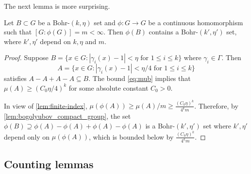 


The next lemma is more surprising.

\begin{lemma} \label{lem:bohr-homo2}
Let $B \subset G$ be a Bohr-$(k, \eta)$ set and $\phi: G \rightarrow G$ be a continuous homomorphism such that $[G:\phi(G)] = m < \infty$. Then $\phi(B)$ contains a Bohr-$(k', \eta')$ set, where $k', \eta'$ depend on $k, \eta$ and $m$.
\end{lemma}

\begin{proof}
Suppose $B = \{x \in G: |\gamma_i(x) - 1| < \eta \text{ for } 1 \leq i \leq k\}$ where $\gamma_i \in \Gamma$. Then 
\[
    A = \{x \in G: |\gamma_i(x) - 1| < \eta/4 \text{ for } 1 \leq i \leq k\}
\]
satisfies $A - A + A - A \subseteq B$. The bound \eqref{eq:mub} implies that $\mu(A) \geq (C_0\eta/4)^k$ for some absolute constant $C_0>0$. 

In view of \cref{lem:finite-index}, $\mu(\phi(A)) \geq \mu(A)/m \geq \frac{(C_0 \eta)^k}{4^k m}$. Therefore, by \cref{lem:bogolyubov_compact_group}, the set $\phi(B) \supseteq \phi(A) - \phi(A) + \phi(A) - \phi(A)$ is a Bohr-$(k', \eta')$ set where $k', \eta'$ depend only on $\mu(\phi(A))$, which is bounded below by $\frac{(C_0 \eta)^k}{4^k m}$.
\end{proof}

\subsection{Counting lemmas} 


